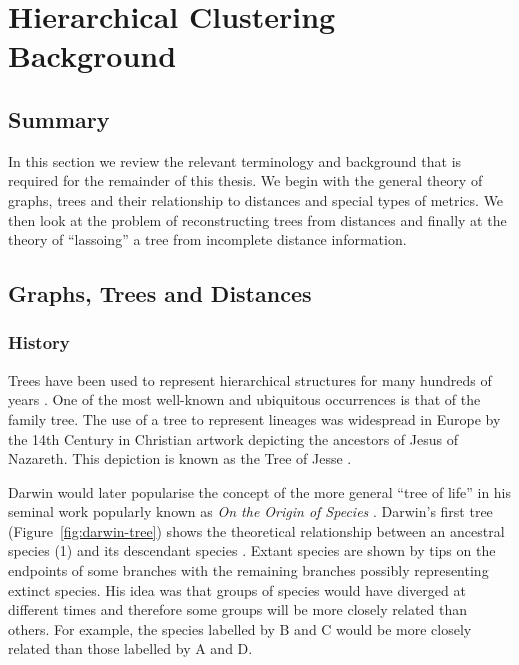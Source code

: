 \chapter{Hierarchical Clustering Background}
\label{cha:background2}

\section{Summary}
\label{sec:summary}

In this section we review the relevant terminology and background that is
required for the remainder of this thesis.  We begin with the general theory
of graphs, trees and their relationship to distances and special types of
metrics.  We then look at the problem of reconstructing trees from distances and
finally at the theory of ``lassoing'' a tree from incomplete distance
information.

\section{Graphs, Trees and Distances}
\label{sec:graphs-trees-dist}

\subsection{History}
\label{sec:history}

Trees have been used to represent hierarchical structures for many hundreds of
years \cite{knuth97taocp1}.  One of the most well-known and ubiquitous
occurrences is that of the family tree.  The use of a tree to represent
lineages was widespread in Europe by the 14th Century in Christian artwork
depicting the ancestors of Jesus of Nazareth.  This depiction is known as the
Tree of Jesse \cite{corblet1860etude}.

Darwin would later popularise the concept of the more general ``tree of life''
in his seminal work popularly known as \textit{On the Origin of Species}
\cite{darwin1859origin}.  Darwin's first tree (Figure~\ref{fig:darwin-tree})
shows the theoretical relationship between an ancestral species (1) and its
descendant species \cite{semple2003phylogenetics}.  Extant species are shown
by tips on the endpoints of some branches with the remaining branches possibly
representing extinct species.  His idea was that groups of species would have
diverged at different times and therefore some groups will be more closely
related than others.  For example, the species labelled by B and C would be
more closely related than those labelled by A and D.

